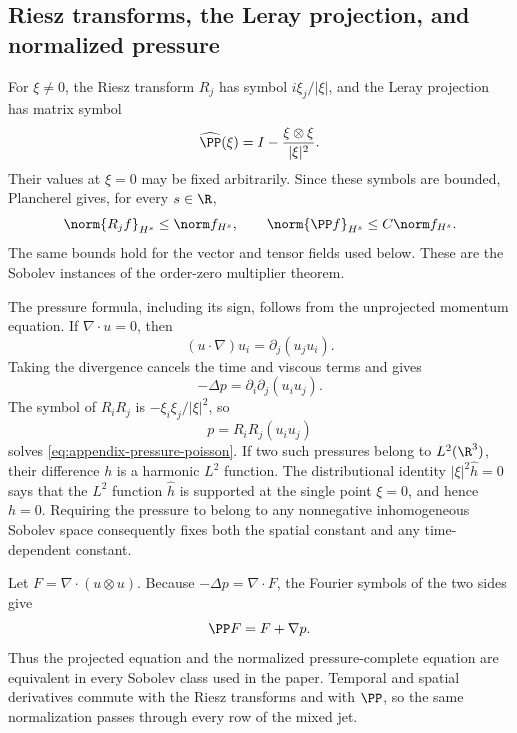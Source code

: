 \subsection{Riesz transforms, the Leray projection, and normalized pressure}

For \(\xi\ne0\), the Riesz transform \(R_j\) has symbol \(i\xi_j/|\xi|\), and the Leray projection has matrix symbol
\[
 \widehat{\PP}(\xi)
 =I-\frac{\xi\otimes\xi}{|\xi|^2}.
\]
Their values at \(\xi=0\) may be fixed arbitrarily.
Since these symbols are bounded, Plancherel gives, for every \(s\in\R\),
\begin{equation}
 \norm{R_jf}_{H^s}\le\norm f_{H^s},
 \qquad
 \norm{\PP f}_{H^s}\le C\norm f_{H^s}.
 \label{eq:appendix-riesz-multiplier-bounds}
\end{equation}
The same bounds hold for the vector and tensor fields used below.
These are the Sobolev instances of the order-zero multiplier theorem.

The pressure formula, including its sign, follows from the unprojected momentum equation.
If \(\nabla\cdot u=0\), then
\[
 (u\cdot\nabla)u_i=\partial_j(u_ju_i).
\]
Taking the divergence cancels the time and viscous terms and gives
\begin{equation}
 -\Delta p=\partial_i\partial_j(u_i u_j).
 \label{eq:appendix-pressure-poisson}
\end{equation}
The symbol of \(R_iR_j\) is \(-\xi_i\xi_j/|\xi|^2\), so
\begin{equation}
 p=R_iR_j(u_i u_j)
 \label{eq:appendix-pressure-riesz}
\end{equation}
solves \eqref{eq:appendix-pressure-poisson}.
If two such pressures belong to \(L^2(\R^3)\), their difference \(h\) is a harmonic \(L^2\) function.
The distributional identity \(|\xi|^2\widehat h=0\) says that the \(L^2\) function \(\widehat h\) is supported at the single point \(\xi=0\), and hence \(h=0\).
Requiring the pressure to belong to any nonnegative inhomogeneous Sobolev space consequently fixes both the spatial constant and any time-dependent constant.

Let \(F=\nabla\cdot(u\otimes u)\).
Because \(-\Delta p=\nabla\cdot F\), the Fourier symbols of the two sides give
\begin{equation}
 \PP F=F+\nabla p.
 \label{eq:appendix-projected-pressure}
\end{equation}
Thus the projected equation and the normalized pressure-complete equation are equivalent in every Sobolev class used in the paper.
Temporal and spatial derivatives commute with the Riesz transforms and with \(\PP\), so the same normalization passes through every row of the mixed jet.

